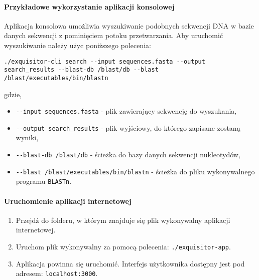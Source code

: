             \paragraph{Przykładowe wykorzystanie aplikacji konsolowej}

                Aplikacja konsolowa umożliwia wyszukiwanie podobnych sekwencji DNA w bazie danych sekwencji z pominięciem potoku przetwarzania. Aby uruchomić wyszukiwanie należy użyc poniższego polecenia:
                
                \texttt{./exquisitor-cli search -\phantom{}-input sequences.fasta -\phantom{}-output search\_results -\phantom{}-blast-db /blast/db -\phantom{}-blast /blast/executables/bin/blastn}

                gdzie,
                \begin{itemize}
                    \item {
                        \texttt{-\phantom{}-input sequences.fasta} - plik zawierający sekwencję do wyszukania,
                    }
                    \item {
                        \texttt{-\phantom{}-output search\_results} - plik wyjściowy, do którego zapisane zostaną wyniki,
                    }
                    \item {
                        \texttt{-\phantom{}-blast-db /blast/db} - ścieżka do bazy danych sekwencji nukleotydów,
                    }
                    \item {
                        \texttt{-\phantom{}-blast /blast/executables/bin/blastn} - ścieżka do pliku wykonywalnego programu \texttt{BLASTn}.
                    }
                \end{itemize}

            \paragraph{Uruchomienie aplikacji internetowej}

                \begin{enumerate}
                    \item {
                        Przejdź do folderu, w którym znajduje się plik wykonywalny aplikacji internetowej.
                    }
                    \item {
                        Uruchom plik wykonywalny za pomocą polecenia: \texttt{./exquisitor-app}.
                    }
                    \item {
                        Aplikacja powinna się uruchomić. Interfejs użytkownika dostępny jest pod adresem: 
                        \texttt{localhost:3000}.
                    }
                \end{enumerate}

